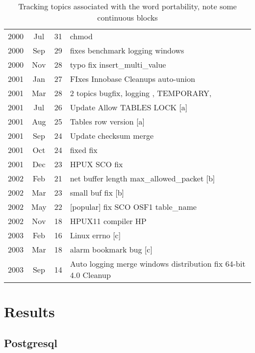 \documentclass{report}
\begin{document}
\begin{table}
\centering
\begin{tabular}{|ccc|l|}
\hline
2000 &  Jul &  31 &    chmod \\
2000 &  Sep &  29 &    fixes benchmark logging windows \\
2000 &  Nov &  28 &    typo fix insert\_multi\_value \\
2001 &  Jan &  27 &    FIxes Innobase Cleanups auto-union \\
2001 &  Mar &  28 &    2 topics bugfix, logging , TEMPORARY,  \\
\hline
2001 &  Jul &  26 &    Update Allow TABLES LOCK [a] \\ 

2001 &  Aug &  25 &    Tables row version [a] \\
\hline
2001 &  Sep &  24 &    Update checksum merge \\
2001 &  Oct &  24 &    fixed fix \\
2001 &  Dec &  23 &    HPUX SCO fix \\
\hline
2002 &  Feb &  21 &    net buffer length  max\_allowed\_packet [b] \\
2002 &  Mar &  23 &    small buf fix [b]  \\
\hline
2002 &  May &  22 &    [popular] fix SCO OSF1 table\_name \\
2002 &  Nov &  18 &    HPUX11 compiler HP \\
\hline
2003 &  Feb &  16 &    Linux errno  [c] \\
2003 &  Mar &  18 &    alarm bookmark bug [c] \\
\hline
2003 &  Sep &  14 &    Auto logging merge windows distribution fix 64-bit 4.0 Cleanup \\
\hline
\end{tabular}
\caption{Tracking topics associated with the word portability, note some continuous blocks}
\label{tab:portability}
\end{table}


\section{Results}
\subsection{Postgresql}
\end{document}
